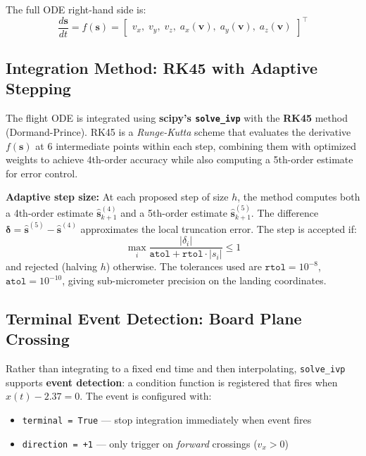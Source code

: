 \documentclass[11pt,letterpaper]{article}
\begin{document}
The full ODE right-hand side is:
\begin{equation}
  \frac{d\bm{s}}{dt} = f(\bm{s}) =
  \begin{bmatrix}
    v_x,\; v_y,\; v_z,\;
    a_x(\bm{v}),\; a_y(\bm{v}),\; a_z(\bm{v})
  \end{bmatrix}^\top
\end{equation}

\subsection{Integration Method: RK45 with Adaptive Stepping}

The flight ODE is integrated using \textbf{scipy's \texttt{solve\_ivp}} with the \textbf{RK45} method (Dormand-Prince). RK45 is a \emph{Runge-Kutta} scheme that evaluates the derivative $f(\bm{s})$ at 6 intermediate points within each step, combining them with optimized weights to achieve 4th-order accuracy while also computing a 5th-order estimate for error control.

\textbf{Adaptive step size:} At each proposed step of size $h$, the method computes both a 4th-order estimate $\hat{\bm{s}}_{k+1}^{(4)}$ and a 5th-order estimate $\hat{\bm{s}}_{k+1}^{(5)}$. The difference $\bm{\delta} = \hat{\bm{s}}^{(5)} - \hat{\bm{s}}^{(4)}$ approximates the local truncation error. The step is accepted if:
\begin{equation}
  \max_i \frac{|\delta_i|}{\texttt{atol} + \texttt{rtol}\cdot|s_i|} \leq 1
\end{equation}
and rejected (halving $h$) otherwise. The tolerances used are $\texttt{rtol} = 10^{-8}$, $\texttt{atol} = 10^{-10}$, giving sub-micrometer precision on the landing coordinates.

\subsection{Terminal Event Detection: Board Plane Crossing}

Rather than integrating to a fixed end time and then interpolating, \texttt{solve\_ivp} supports \textbf{event detection}: a condition function is registered that fires when $x(t) - 2.37 = 0$. The event is configured with:
\begin{itemize}[nosep]
  \item \texttt{terminal = True} — stop integration immediately when event fires
  \item \texttt{direction = +1} — only trigger on \emph{forward} crossings ($v_x > 0$)
\end{itemize}
\end{document}
